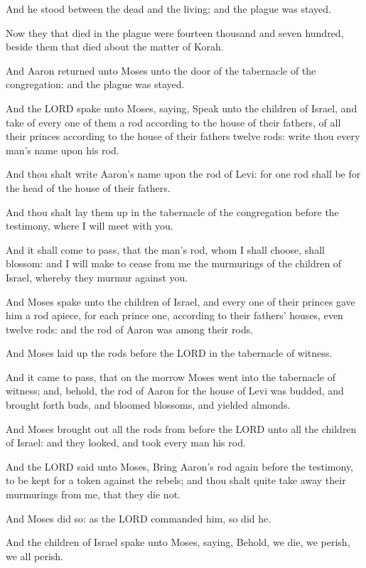 \Verse And he stood between the dead and the living; and the plague was
stayed.

\Verse Now they that died in the plague were fourteen thousand and
seven hundred, beside them that died about the matter of Korah.

\Verse And Aaron returned unto Moses unto the door of the tabernacle of
the congregation: and the plague was stayed.


\Chapter
\Verse And the LORD spake unto Moses, saying, \Verse Speak unto the
children of Israel, and take of every one of them a rod according to
the house of their fathers, of all their princes according to the
house of their fathers twelve rods: write thou every man's name upon
his rod.

\Verse And thou shalt write Aaron's name upon the rod of Levi: for one
rod shall be for the head of the house of their fathers.

\Verse And thou shalt lay them up in the tabernacle of the congregation
before the testimony, where I will meet with you.

\Verse And it shall come to pass, that the man's rod, whom I shall
choose, shall blossom: and I will make to cease from me the murmurings
of the children of Israel, whereby they murmur against you.

\Verse And Moses spake unto the children of Israel, and every one of
their princes gave him a rod apiece, for each prince one, according to
their fathers' houses, even twelve rods: and the rod of Aaron was
among their rods.

\Verse And Moses laid up the rods before the LORD in the tabernacle of
witness.

\Verse And it came to pass, that on the morrow Moses went into the
tabernacle of witness; and, behold, the rod of Aaron for the house of
Levi was budded, and brought forth buds, and bloomed blossoms, and
yielded almonds.

\Verse And Moses brought out all the rods from before the LORD unto all
the children of Israel: and they looked, and took every man his rod.

\Verse And the LORD said unto Moses, Bring Aaron's rod again before the
testimony, to be kept for a token against the rebels; and thou shalt
quite take away their murmurings from me, that they die not.

\Verse And Moses did so: as the LORD commanded him, so did he.

\Verse And the children of Israel spake unto Moses, saying, Behold, we
die, we perish, we all perish.

